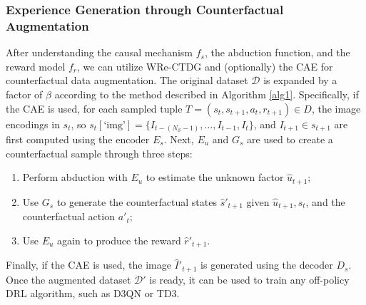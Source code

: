 \subsubsection{Experience Generation through Counterfactual Augmentation}

After understanding the causal mechanism \( f_s \),
the abduction function, and the reward model \( f_r \),
we can utilize WRe-CTDG and (optionally) the CAE
for counterfactual
data augmentation. The original dataset \( \mathcal{D} \)
is expanded by a factor of \( \beta \)
according to the method described in Algorithm \ref{alg1}.
Specifically, if the CAE is used, for each sampled tuple
\( T = (s_t, s_{t+1}, a_t, r_{t+1}) \in D \),
the image encodings in $s_t$, so
\( s_t[\text{`img'}] = \{I_{t-(N_{\mathcal{S}}-1)}, \ldots, I_{t-1}, I_t\} \),
and \( I_{t+1} \in s_{t+1} \) are first computed using
the encoder \( E_s \). Next, \( E_u \) and \( G_s \)
are used to create a counterfactual
sample through three steps:
\begin{enumerate}
    \item Perform abduction with \( E_u \) to estimate
    the unknown factor \( \hat{u}_{t+1} \);
    \item Use \( G_s \) to generate the counterfactual
    states \( \hat{s}'_{t+1} \) given
    \( \hat{u}_{t+1}, s_t \), and the counterfactual
    action \( a'_t \);
    \item Use \( E_u \) again to produce the reward
    \( \hat{r}'_{t+1} \).
\end{enumerate}

Finally, if the CAE is used,
the image \( \hat{I}'_{t+1} \) is generated using
the decoder \( D_s \). Once the augmented dataset
\( \mathcal{D}' \)
is ready, it can be used to train any off-policy DRL
algorithm, such as D3QN or TD3.


